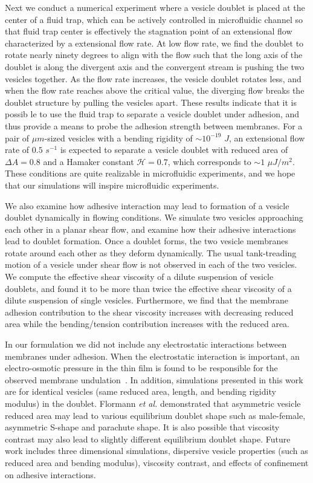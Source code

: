 \documentclass[prf,superscriptaddress,showpacs]{revtex4-1}
\begin{document}
Next we conduct a numerical experiment where a vesicle doublet is placed
at the center of a fluid trap, which can be actively controlled in
microfluidic channel so that fluid trap center is effectively the
stagnation point of an extensional flow characterized by a extensional
flow rate.  At low flow rate, we find the doublet to rotate nearly ninety
degrees to align with the flow such that the long axis of the doublet is
along the divergent axis and the convergent stream is pushing the two
vesicles together. As the flow rate increases, the vesicle doublet
rotates less, and when the flow rate reaches above the critical value,
the diverging flow breaks the doublet structure by pulling the vesicles
apart.  These results indicate that it is possib le to use the fluid trap
to separate a vesicle doublet under adhesion, and thus provide a means
to probe the adhesion strength between membranes.  For a pair of $\mu
m$-sized vesicles with a bending rigidity of $\sim 10^{-19}$ $J$, an
extensional flow rate of $0.5$ $s^{-1}$ is expected to separate a
vesicle doublet with reduced area of $\Delta A = 0.8$ and a Hamaker
constant $\mathcal{H}=0.7$, which corresponds to $\sim 1$ $\mu J/m^2$.
These conditions are quite realizable in microfluidic experiments, and
we hope that our simulations will inspire microfluidic experiments.

We also examine how adhesive interaction may lead to formation of a
vesicle doublet dynamically in flowing conditions.  We simulate two
vesicles approaching each other in a planar shear flow, and examine how
their adhesive interactions lead to doublet formation.  Once a doublet
forms, the two vesicle membranes rotate around each other as they deform
dynamically. The usual tank-treading motion of a vesicle under shear
flow is not observed in each of the two vesicles. We compute the
effective shear viscosity of a dilute suspension of vesicle doublets,
and found it to be more than twice the effective shear viscosity of a
dilute suspension of single vesicles.  Furthermore, we find that the
membrane adhesion contribution to the shear viscosity increases with
decreasing reduced area while the bending/tension contribution increases
with the reduced area.

In our formulation we did not include any electrostatic interactions
between membranes under adhesion. When the electrostatic interaction is
important, an electro-osmotic pressure in the thin film is found to be
responsible for the observed membrane
undulation~\cite{SteinkuhlerAgudo-Canalejo2016_BJ}.
In addition, simulations presented in this work are for identical vesicles (same reduced area, length, and
bending rigidity modulus) in the doublet. Flormann {\it et al.} demonstrated that asymmetric vesicle reduced area
may lead to various equilibrium doublet shape such as male-female, asymmetric S-shape and parachute shape.
It is also possible that viscosity contrast may also lead to slightly different equilibrium doublet shape.
Future work includes three dimensional simulations, dispersive vesicle properties (such as
reduced area and bending modulus), viscosity contrast, and effects of confinement on adhesive interactions.
\end{document}
